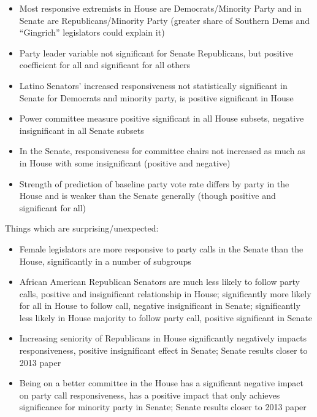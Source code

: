 \documentclass[12pt]{article}
\begin{document}
\begin{itemize}
	
	\item Most responsive extremists in House are Democrats/Minority Party and in Senate are Republicans/Minority Party (greater share of Southern Dems and ``Gingrich'' legislators could explain it)
	
	\item Party leader variable not significant for Senate Republicans, but positive coefficient for all and significant for all others
	
	\item Latino Senators' increased responsiveness not statistically significant in Senate for Democrats and minority party, is positive significant in House
	
	\item Power committee measure positive significant in all House subsets, negative insignificant in all Senate subsets
	
	\item In the Senate, responsiveness for committee chairs not increased as much as in House with some insignificant (positive and negative)
	
	\item Strength of prediction of baseline party vote rate differs by party in the House and is weaker than the Senate generally (though positive and significant for all)
	
\end{itemize}

\noindent
Things which are surprising/unexpected:

\begin{itemize}	
	
	\item Female legislators are more responsive to party calls in the Senate than the House, significantly in a number of subgroups
	
	\item African American Republican Senators are much less likely to follow party calls, positive and insignificant relationship in House; significantly more likely for all in House to follow call, negative insignificant in Senate; significantly less likely in House majority to follow party call, positive significant in Senate
	
	\item Increasing seniority of Republicans in House significantly negatively impacts responsiveness, positive insignificant effect in Senate; Senate results closer to 2013 paper
	
	\item Being on a better committee in the House has a significant negative impact on party call responsiveness, has a positive impact that only achieves significance for minority party in Senate;
	Senate results closer to 2013 paper
	
\end{itemize}
\end{document}
